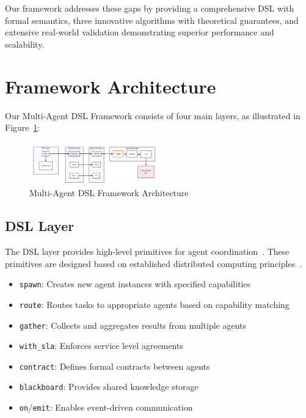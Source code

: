 \documentclass[conference]{IEEEtran}
\begin{document}
Our framework addresses these gaps by providing a comprehensive DSL with formal semantics, three innovative algorithms with theoretical guarantees, and extensive real-world validation demonstrating superior performance and scalability.

\section{Framework Architecture}

Our Multi-Agent DSL Framework consists of four main layers, as illustrated in Figure~\ref{fig:architecture}:

\begin{figure}[htbp]
\centering
\includegraphics[width=0.5\textwidth]{figures/images/system_architecture.png}
\caption{Multi-Agent DSL Framework Architecture}
\label{fig:architecture}
\end{figure}

\subsection{DSL Layer}

The DSL layer provides high-level primitives for agent coordination~\cite{herlihy2012art,attiya2004distributed}. These primitives are designed based on established distributed computing principles~\cite{musa2004software}.

\begin{itemize}
\item \texttt{spawn}: Creates new agent instances with specified capabilities
\item \texttt{route}: Routes tasks to appropriate agents based on capability matching
\item \texttt{gather}: Collects and aggregates results from multiple agents
\item \texttt{with\_sla}: Enforces service level agreements
\item \texttt{contract}: Defines formal contracts between agents
\item \texttt{blackboard}: Provides shared knowledge storage
\item \texttt{on}/\texttt{emit}: Enables event-driven communication
\end{itemize}
\end{document}
